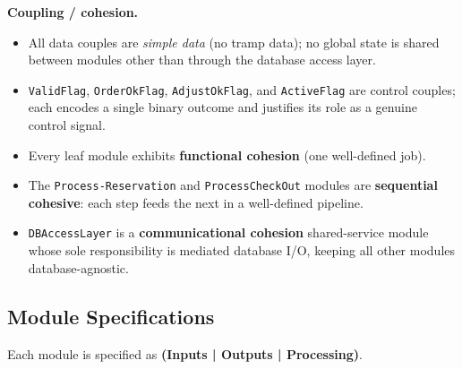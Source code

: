 \documentclass[12pt,a4paper]{article}
\begin{document}
\noindent\textbf{Coupling / cohesion.}
\begin{itemize}[leftmargin=1.5em]
  \item All data couples are \emph{simple data} (no tramp data); no global state is
        shared between modules other than through the database access layer.
  \item \texttt{ValidFlag}, \texttt{OrderOkFlag}, \texttt{AdjustOkFlag}, and
        \texttt{ActiveFlag} are control couples; each encodes a single binary outcome
        and justifies its role as a genuine control signal.
  \item Every leaf module exhibits \textbf{functional cohesion} (one well-defined job).
  \item The \texttt{Process-Reservation} and \texttt{ProcessCheckOut} modules are
        \textbf{sequential cohesive}: each step feeds the next in a well-defined pipeline.
  \item \texttt{DBAccessLayer} is a \textbf{communicational cohesion} shared-service
        module whose sole responsibility is mediated database I/O, keeping all other
        modules database-agnostic.
\end{itemize}

\newpage

\subsection{Module Specifications}

Each module is specified as \textbf{(Inputs | Outputs | Processing)}.
\end{document}
